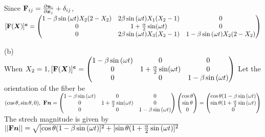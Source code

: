 \medskip
Since $\mathbf{F}_{ij} = \frac{\partial{\bm{u}_i}}{\partial{\bm{x}_j}}+\delta_{ij}$,\\
$[\mathbf{F}(\bm{X})]^{\bm{e}}=\begin{pmatrix}
1-\beta \sin{(\omega t})X_2(2-X_2) & 2\beta \sin{(\omega t})X_1(X_2-1) & 0\\
0 & 1+\frac{\alpha}{2}\sin({\omega t}) & 0\\
0 & 2\beta \sin{(\omega t})X_3(X_2-1)&1-\beta \sin{(\omega t})X_2(2-X_2)
\end{pmatrix}$

\medskip
(b)\\
When $X_2 = 1,[\mathbf{F}(\bm{X})]^{\bm{e}} = \begin{pmatrix}
1-\beta \sin{(\omega t}) & 0 & 0\\
0 & 1+\frac{\alpha}{2}\sin({\omega t})  & 0\\
0 & 0&1-\beta \sin{(\omega t)}
\end{pmatrix}$ 
Let the orientation of the fiber be$(\cos\theta,\sin\theta,0),\ \bn{F}\bm{n}=\begin{pmatrix}
1-\beta \sin{(\omega t}) & 0 & 0\\
0 & 1+\frac{\alpha}{2}\sin({\omega t})  & 0\\
0 & 0&1-\beta \sin{(\omega t)}
\end{pmatrix}
\begin{pmatrix}
    \cos\theta \\ \sin\theta \\ 0
\end{pmatrix}
=\begin{pmatrix}
    \cos\theta(1-\beta\sin{(\omega t)} \\ \sin\theta(1+\frac\alpha2\sin{(\omega t)} \\ 0
\end{pmatrix}
$ \\
The strech magnitude is given by $||\mathbf{F}\bm{n}||=\sqrt{[\cos\theta(1-\beta\sin{(\omega t)}]^2+[\sin\theta(1+\frac\alpha2\sin{(\omega t)}]^2}$


